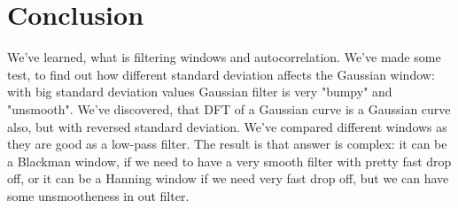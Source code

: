 \documentclass[a4paper]{article}
\begin{document}
    \newpage
        \section{Conclusion}
            We've learned, what is filtering windows and autocorrelation. We've made some test, to find out how different standard deviation affects the Gaussian window: with big standard deviation values Gaussian filter is very "bumpy" and "unsmooth". We've discovered, that DFT of a Gaussian curve is a Gaussian curve also, but with reversed standard deviation. We've compared different windows as they are good as a low-pass filter. The result is that answer is complex: it can be a Blackman window, if we need to have a very smooth filter with pretty fast drop off, or it can be a Hanning window if we need very fast drop off, but we can have some unsmootheness in out filter.
     
\end{document}
